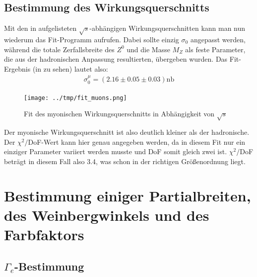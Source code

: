 \subsection{Bestimmung des Wirkungsquerschnitts}
Mit den in  aufgelisteten $\sqrt{s}$-abhängigen Wirkungsquerschnitten kann man nun wiederum das Fit-Programm aufrufen. Dabei sollte einzig $\sigma_0$ angepasst werden, während die totale Zerfallsbreite des $Z^0$ und die Masse $M_Z$ als feste Parameter, die aus der hadronischen Anpassung resultierten, übergeben wurden. Das Fit-Ergebnis (in  zu sehen) lautet also:
\begin{eqnarray}
\sigma_0^{\mu} = (2.16 \pm 0.05 \pm 0.03)\si{\nano\barn}
\end{eqnarray}
\begin{figure}[htb]
	\centering
	\texttt{[image: ../tmp/fit\_muons.png]}
	\caption{Fit des myonischen Wirkungsquerschnitts in Abhängigkeit von $\sqrt{s}$}
	\label{fig:muonfit}
\end{figure}
Der myonische Wirkungsquerschnitt ist also deutlich kleiner als der hadronische.\\
Der $\chi^2/$DoF-Wert kann hier genau angegeben werden, da in diesem Fit nur ein einziger Parameter variiert werden musste und DoF somit gleich zwei ist. $\chi^2/$DoF beträgt in diesem Fall also 3.4, was schon in der richtigen Größenordnung liegt.

\section{Bestimmung einiger Partialbreiten, des Weinbergwinkels und des Farbfaktors}
\subsection{$\Gamma_e$-Bestimmung}
